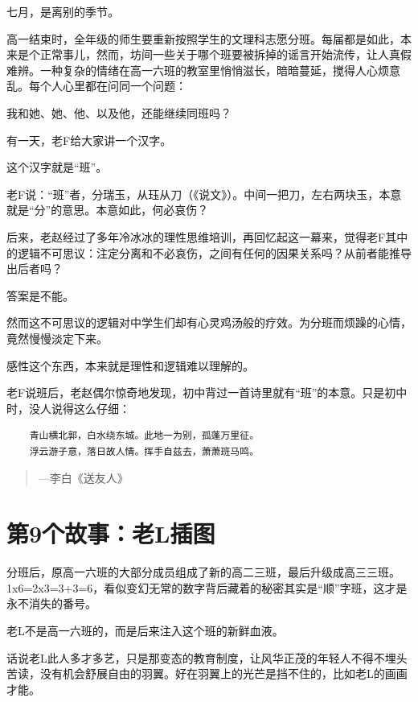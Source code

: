 \documentclass[openany]{ctexbook}
\begin{document}
七月，是离别的季节。

高一结束时，全年级的师生要重新按照学生的文理科志愿分班。每届都是如此，本来是个正常事儿，然而，坊间一些关于哪个班要被拆掉的谣言开始流传，让人真假难辨。一种复杂的情绪在高一六班的教室里悄悄滋长，暗暗蔓延，搅得人心烦意乱。每个人心里都在问同一个问题：

我和她、她、他、以及他，还能继续同班吗？

有一天，老F给大家讲一个汉字。

这个汉字就是``班''。

老F说：``班''者，分瑞玉，从珏从刀（《说文》）。中间一把刀，左右两块玉，本意就是``分''的意思。本意如此，何必哀伤？

后来，老赵经过了多年冷冰冰的理性思维培训，再回忆起这一幕来，觉得老F其中的逻辑不可思议：注定分离和不必哀伤，之间有任何的因果关系吗？从前者能推导出后者吗？

答案是不能。

然而这不可思议的逻辑对中学生们却有心灵鸡汤般的疗效。为分班而烦躁的心情，竟然慢慢淡定下来。

感性这个东西，本来就是理性和逻辑难以理解的。

老F说班后，老赵偶尔惊奇地发现，初中背过一首诗里就有``班''的本意。只是初中时，没人说得这么仔细：

\begin{verbatim}
    青山横北郭，白水绕东城。此地一为别，孤蓬万里征。
    浮云游子意，落日故人情。挥手自兹去，萧萧班马鸣。  
\end{verbatim}

\begin{quote}
\begin{flushright}---李白《送友人》\end{flushright}
\end{quote}

\chapter*{第9个故事：老L插图}\label{l9}

分班后，原高一六班的大部分成员组成了新的高二三班，最后升级成高三三班。1x6=2x3=3+3=6，看似变幻无常的数字背后藏着的秘密其实是``顺''字班，这才是永不消失的番号。

老L不是高一六班的，而是后来注入这个班的新鲜血液。

话说老L此人多才多艺，只是那变态的教育制度，让风华正茂的年轻人不得不埋头苦读，没有机会舒展自由的羽翼。好在羽翼上的光芒是挡不住的，比如老L的画画才能。
\end{document}
